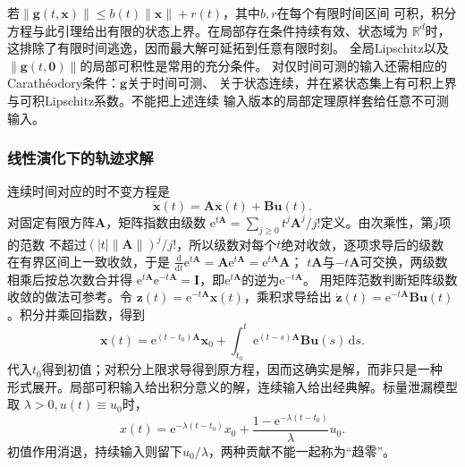若$\|\bm g(t,\bm x)\|\leq b(t)\|\bm x\|+r(t)$，其中$b,r$在每个有限时间区间
可积，积分方程与此引理给出有限的状态上界。在局部存在条件持续有效、状态域为
$\mathbb R^d$时，这排除了有限时间逃逸，因而最大解可延拓到任意有限时刻。
全局Lipschitz以及$\|\bm g(t,\bm0)\|$的局部可积性是常用的充分条件。
对仅时间可测的输入还需相应的Carathéodory条件：$\bm g$关于时间可测、
关于状态连续，并在紧状态集上有可积上界与可积Lipschitz系数。不能把上述连续
输入版本的局部定理原样套给任意不可测输入。

\subsubsection{线性演化下的轨迹求解}
连续时间对应的时不变方程是
\begin{equation}
  \dot{\bm x}(t)=\bm A\bm x(t)+\bm B\bm u(t).
  \label{eq:dynamical-lti-continuous}
\end{equation}
对固定有限方阵$\bm A$，矩阵指数由级数
$\mathrm e^{t\bm A}=\sum_{j\geq0}t^j\bm A^j/j!$定义。由次乘性，第$j$项的范数
不超过$(|t|\lVert\bm A\rVert)^j/j!$，所以级数对每个$t$绝对收敛，逐项求导后的级数
在有界区间上一致收敛，于是
$\frac{\mathrm d}{\mathrm dt}\mathrm e^{t\bm A}
=\bm A\mathrm e^{t\bm A}=\mathrm e^{t\bm A}\bm A$；
$t\bm A$与$-t\bm A$可交换，两级数相乘后按总次数合并得
$\mathrm e^{t\bm A}\mathrm e^{-t\bm A}=\bm I$，即$\mathrm e^{t\bm A}$的逆为$\mathrm e^{-t\bm A}$。
用矩阵范数判断矩阵级数收敛的做法可参考。令
$\bm z(t)=\mathrm e^{-t\bm A}\bm x(t)$，乘积求导给出
$\dot{\bm z}(t)=\mathrm e^{-t\bm A}\bm B\bm u(t)$。积分并乘回指数，得到
\begin{equation}
  \bm x(t)=\mathrm e^{(t-t_0)\bm A}\bm x_0+
    \int_{t_0}^t\mathrm e^{(t-s)\bm A}\bm B\bm u(s)\,\mathrm ds.
  \label{eq:dynamical-lti-variation-constants}
\end{equation}
代入$t_0$得到初值；对积分上限求导得到原方程，因而这确实是解，而非只是一种
形式展开。局部可积输入给出积分意义的解，连续输入给出经典解。标量泄漏模型取
$\lambda>0,u(t)\equiv u_0$时，
\[
  x(t)=\mathrm e^{-\lambda(t-t_0)}x_0+
    \frac{1-\mathrm e^{-\lambda(t-t_0)}}{\lambda}u_0.
\]
初值作用消退，持续输入则留下$u_0/\lambda$，两种贡献不能一起称为“趋零”。

